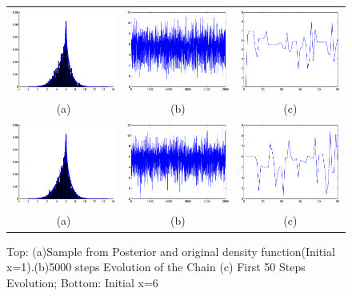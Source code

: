\documentclass[12pt] {article}
\begin{document}
\begin{figure}
\begin{center}
\begin{tabular}{ccc}
\includegraphics[height=1.1in]{st1_abr.eps}&
\includegraphics[height=1.1in]{st1_all.eps}&
\includegraphics[height=1.1in]{st1_50.eps}\\
(a) & (b) & (c)\\
\includegraphics[height=1.1in]{st6_bar.eps}&
\includegraphics[height=1.1in]{st6_all.eps}&
\includegraphics[height=1.1in]{st6_50.eps}\\
(a) & (b) & (c)
\end{tabular}
\caption{Top: (a)Sample from Posterior and original density function(Initial x=1).(b)5000 steps Evolution of the Chain (c) First 50 Steps Evolution; Bottom: Initial x=6}

\end{center}
\end{figure}
\end{document}
